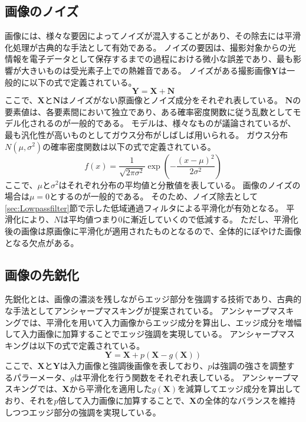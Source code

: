 \documentclass[11pt,a4paper]{jsarticle}
\begin{document}
\subsection{画像のノイズ}
画像には、様々な要因によってノイズが混入することがあり、その除去には平滑化処理が古典的な手法として有効である。
ノイズの要因は、撮影対象からの光情報を電子データとして保存するまでの過程における微小な誤差であり、最も影響が大きいものは受光素子上での熱雑音である。
ノイズがある撮影画像$\mathbf{Y}$は一般的に以下の式で定義されている。
\begin{equation}
	\mathbf{Y}=\mathbf{X}+\mathbf{N}
\end{equation}
ここで、$\mathbf{X}$と$\mathbf{N}$はノイズがない原画像とノイズ成分をそれぞれ表している。
$\mathbf{N}$の要素値は、各要素間において独立であり、ある確率密度関数に従う乱数としてモデル化されるのが一般的である。
モデルは、様々なものが議論されているが、最も汎化性が高いものとしてガウス分布がしばしば用いられる。
ガウス分布$N(\mu, \sigma^2)$の確率密度関数は以下の式で定義されている。
\begin{equation}
	f(x)=\frac{1}{\sqrt{2\pi\sigma^2}}
	\exp\left(
	-\frac{(x-\mu)^2}{2\sigma^2}
	\right)
	\label{eq:Noise}
\end{equation}
ここで、$\mu$と$\sigma^2$はそれぞれ分布の平均値と分散値を表している。
画像のノイズの場合は$\mu=0$とするのが一般的である。
そのため、ノイズ除去として\ref{sec:Lowpassfilter}節で示した低域通過フィルタによる平滑化が有効となる。
平滑化により、$N$は平均値つまり$0$に漸近していくので低減する。
ただし、平滑化後の画像は原画像に平滑化が適用されたものとなるので、全体的にぼやけた画像となる欠点がある。


\subsection{画像の先鋭化}\label{sec:UM}
先鋭化とは、画像の濃淡を残しながらエッジ部分を強調する技術であり、古典的な手法としてアンシャープマスキングが提案されている。
アンシャープマスキングでは、平滑化を用いて入力画像からエッジ成分を算出し、エッジ成分を増幅して入力画像に加算することでエッジ強調を実現している。
アンシャープマスキングは以下の式で定義されている。
\begin{equation}
	\mathbf{Y}=\mathbf{X}
	+p\left(\mathbf{X}-g(\mathbf{X})\right)
	\label{eq:UM}
\end{equation}
ここで、$\mathbf{X}$と$\mathbf{Y}$は入力画像と強調後画像を表しており、$p$は強調の強さを調整するパラーメータ、$g$は平滑化を行う関数をそれぞれ表している。
アンシャープマスキングでは、$\mathbf{X}$から平滑化を適用した$g(\mathbf{X})$を減算してエッジ成分を算出しており、それを$p$倍して入力画像に加算することで、$\mathbf{X}$の全体的なバランスを維持しつつエッジ部分の強調を実現している。
\end{document}
